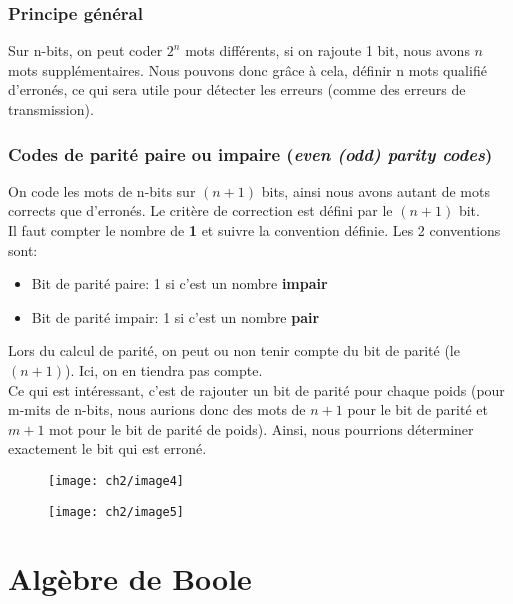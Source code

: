 \subsubsection{Principe général}
Sur n-bits, on peut coder $2^n$ mots différents, si on rajoute 1 bit, nous avons $n$ mots supplémentaires. Nous pouvons donc grâce à cela, définir n mots qualifié d'erronés, ce qui sera utile pour détecter les erreurs (comme des erreurs de transmission).
\subsubsection{Codes de parité paire ou impaire (\textit{even (odd) parity codes})}
On code les mots de n-bits sur $(n+1)$ bits, ainsi nous avons autant de mots corrects que d'erronés. Le critère de correction est défini par le $(n+1)$ bit.\\

Il faut compter le nombre de \textbf{1} et suivre la convention définie. Les 2 conventions sont: 
\begin{itemize}
	\item Bit de parité paire: 1 si c'est un nombre \textbf{impair}
	\item Bit de parité impair: 1 si c'est un nombre \textbf{pair}
\end{itemize}
Lors du calcul de parité, on peut ou non tenir compte du bit de parité (le $(n+1)$). Ici, on en tiendra pas compte.\\

Ce qui est intéressant, c'est de rajouter un bit de parité pour chaque poids (pour m-mits de n-bits, nous aurions donc des mots de $n+1$ pour le bit de parité et $m+1$ mot pour le bit de parité de poids). Ainsi, nous pourrions déterminer exactement le bit qui est erroné.
\begin{figure}[H]

	\begin{minipage}{0.55\textwidth}
	\texttt{[image: ch2/image4]}
	\end{minipage}
	\begin{minipage}{0.5\textwidth}
		\texttt{[image: ch2/image5]}
	\end{minipage}
\end{figure}

\section{Algèbre de Boole}
